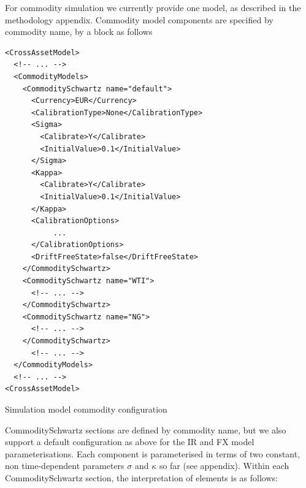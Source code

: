 \documentclass[12pt, a4paper]{article}
\begin{document}
{%


For commodity simulation we currently provide one model, as described in the methodology appendix. 
Commodity model components are specified by commodity name, by a block as follows

\begin{listing}[H]
\begin{verbatim}
<CrossAssetModel>	
  <!-- ... -->
  <CommodityModels>
    <CommoditySchwartz name="default">
      <Currency>EUR</Currency>
      <CalibrationType>None</CalibrationType>
      <Sigma>
        <Calibrate>Y</Calibrate>
        <InitialValue>0.1</InitialValue>
      </Sigma>
      <Kappa>
        <Calibrate>Y</Calibrate>
        <InitialValue>0.1</InitialValue>
      </Kappa>
      <CalibrationOptions>
           ...
      </CalibrationOptions>
      <DriftFreeState>false</DriftFreeState>
    </CommoditySchwartz>
    <CommoditySchwartz name="WTI">
      <!-- ... -->
    </CommoditySchwartz>
    <CommoditySchwartz name="NG">
      <!-- ... -->
    </CommoditySchwartz>
      <!-- ... -->
  </CommodityModels>
  <!-- ... -->
<CrossAssetModel>	
\end{verbatim}
\caption{Simulation model commodity configuration}
\label{lst:simulation_model_com_configuration}
\end{listing}

CommoditySchwartz sections are defined by commodity name, but we also support a default configuration as above for the IR and 
FX model parameterisations.  Each component is parameterised in terms of two constant, non time-dependent parameters $\sigma$ and $\kappa$ so far (see appendix).
Within each CommoditySchwartz section, the interpretation of elements is as follows:

}
\end{document}
